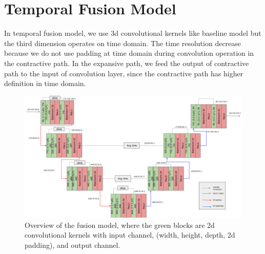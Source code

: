 \section{Temporal Fusion Model}
In temporal fusion model, we use 3d convolutional kernels like baseline model but the third dimension operates on time domain. The time resolution decrease because we do not use padding at time domain during convolution operation in the contractive path. In the expansive path, we feed the output of contractive path to the input of convolution layer, since the contractive path has higher definition in time domain.
\begin{figure}
	\centering
	\includegraphics[width=1.0\columnwidth]{figures/ch4/temporal-fusion.png}
	\caption{Overview of the fusion model, where the green blocks are 2d convolutional kernels with input channel, (width, height, depth, 2d padding), and output channel.}
	\label{fig:view-baseline}
\end{figure}
\newpage
